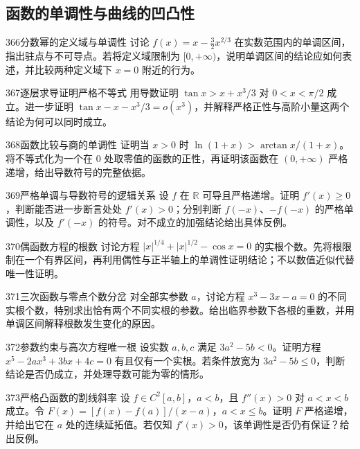 \subsection{函数的单调性与曲线的凹凸性}
\begin{exercise}{366}{分数幂的定义域与单调性}
讨论 $f(x)=x-\tfrac32x^{2/3}$ 在实数范围内的单调区间，指出驻点与不可导点。若将定义域限制为 $[0,+\infty)$，说明单调区间的结论应如何表述，并比较两种定义域下 $x=0$ 附近的行为。
\end{exercise}
\begin{exercise}{367}{逐层求导证明严格不等式}
用导数证明 $\tan x>x+x^3/3$ 对 $0<x<\pi/2$ 成立。进一步证明 $\tan x-x-x^3/3=o(x^3)$，并解释严格正性与高阶小量这两个结论为何可以同时成立。
\end{exercise}
\begin{exercise}{368}{函数比较与商的单调性}
证明当 $x>0$ 时 $\ln(1+x)>\arctan x/(1+x)$。将不等式化为一个在 $0$ 处取零值的函数的正性，再证明该函数在 $(0,+\infty)$ 严格递增，给出导数符号的完整依据。
\end{exercise}
\begin{exercise}{369}{严格单调与导数符号的逻辑关系}
设 $f$ 在 $\mathbb R$ 可导且严格递增。证明 $f'(x)\ge0$，判断能否进一步断言处处 $f'(x)>0$；分别判断 $f(-x)$、$-f(-x)$ 的严格单调性，以及 $f'(-x)$ 的符号。对不成立的加强结论给出具体反例。
\end{exercise}
\begin{exercise}{370}{偶函数方程的根数}
讨论方程 $|x|^{1/4}+|x|^{1/2}-\cos x=0$ 的实根个数。先将根限制在一个有界区间，再利用偶性与正半轴上的单调性证明结论；不以数值近似代替唯一性证明。
\end{exercise}
\begin{exercise}{371}{三次函数与零点个数分岔}
对全部实参数 $a$，讨论方程 $x^3-3x-a=0$ 的不同实根个数，特别求出恰有两个不同实根的参数。给出临界参数下各根的重数，并用单调区间解释根数发生变化的原因。
\end{exercise}
\begin{exercise}{372}{参数约束与高次方程唯一根}
设实数 $a,b,c$ 满足 $3a^2-5b<0$。证明方程 $x^5-2ax^3+3bx+4c=0$ 有且仅有一个实根。若条件放宽为 $3a^2-5b\le0$，判断结论是否仍成立，并处理导数可能为零的情形。
\end{exercise}
\begin{exercise}{373}{严格凸函数的割线斜率}
设 $f\in C^2[a,b]$，$a<b$，且 $f''(x)>0$ 对 $a<x<b$ 成立。令 $F(x)=[f(x)-f(a)]/(x-a)$，$a<x\le b$。证明 $F$ 严格递增，并给出它在 $a$ 处的连续延拓值。若仅知 $f'(x)>0$，该单调性是否仍有保证？给出反例。
\end{exercise}
